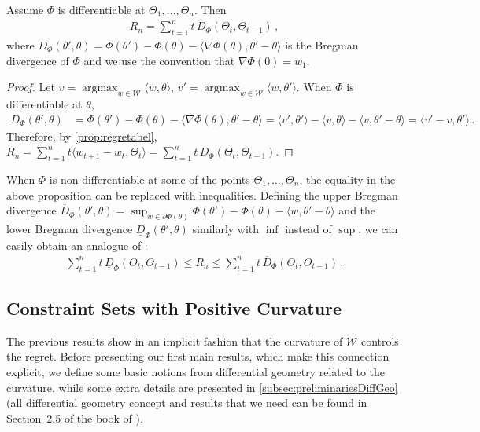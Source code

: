 \documentclass[english]{article}
\newcommand{\cW}{\mathcal{W}}
\newcommand{\inpro}[2]{\langle #1, #2\rangle}
\newcommand{\ip}[1]{\langle#1\rangle}
\newcommand{\uD}{\overline{D}}
\newcommand{\lD}{\underline{D}}
\DeclareMathOperator*{\argmax}{argmax}
\begin{document}
\begin{proposition} 
\label{prop:R_nBregmanDivergence}
Assume $\Phi$ is differentiable at $\Theta_1, \ldots, \Theta_n$. Then 
\begin{align}
\label{eq:regreteq}
R_n = \sum_{t=1}^{n} t\,D_{\Phi}(\Theta_t,\Theta_{t-1})\,,
\end{align}
where $D_{\Phi}(\theta', \theta) = \Phi(\theta') - \Phi(\theta) - \ip{ \nabla\Phi(\theta), \theta' - \theta}$ is the Bregman divergence of $\Phi$
and
we use the convention that $\nabla\Phi(0) = w_1$.
\end{proposition}
\begin{proof}
Let $v = \argmax_{w\in\cW}\inpro{w}{\theta}$, 
$v' = \argmax_{w\in \cW}\ip{w,\theta'}$.
When $\Phi$ is differentiable at $\theta$,
\begin{align}
D_{\Phi}(\theta', \theta) & = \Phi(\theta') - \Phi(\theta) - \inpro{\nabla\Phi(\theta)}{\theta' \!- \theta} 
  =  \inpro{v'}{\theta'} \!- \inpro{v}{\theta} -\inpro{v}{\theta' \!- \theta} = \inpro{v'\!-v}{\theta'}\,. 
\label{eq:bregman}
\end{align}
Therefore, by \cref{prop:regretabel}, $R_n = \sum_{t=1}^{n} t\ip{ w_{t+1}-w_t,\Theta_t} = \sum_{t=1}^{n} t\,D_{\Phi}(\Theta_t,\Theta_{t-1})$.
\end{proof}

When $\Phi$ is non-differentiable at some of the points $\Theta_1,\dots,\Theta_n$, the equality in the above proposition can be replaced with inequalities.
Defining the upper Bregman divergence 
$\uD_{\Phi}(\theta', \theta) 
= \sup_{w\in \partial \Phi(\theta)} \Phi(\theta') - \Phi(\theta) - \ip{ w, \theta' - \theta}$ and the lower Bregman divergence $\lD_{\Phi}(\theta', \theta)$ similarly with $\inf$ instead of $\sup$, 
we can easily obtain an analogue of :
\begin{align}
\label{eq:regreteq_alt}
\sum_{t=1}^{n} t\,\lD_{\Phi}(\Theta_t,\Theta_{t-1})
\le
R_n 
\le \sum_{t=1}^{n} t\,\uD_{\Phi}(\Theta_t,\Theta_{t-1})\,.
\end{align}

\subsection{Constraint Sets with Positive Curvature}
\label{subsec:positiveCurvature}
The previous results show in an implicit fashion that the curvature of $\cW$ controls the regret. Before presenting our first main results, which make this connection explicit, we define some basic notions from differential geometry related to the curvature, while some extra details are presented in \cref{subsec:preliminariesDiffGeo} (all differential geometry concept and results that we need can be found in Section~2.5 of the book of \citealp{Sch14:ConvexBodies}).
\end{document}
